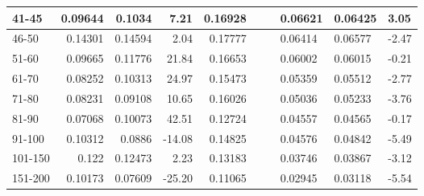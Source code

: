 \begin{table*}[]
\begin{tabular}{|l|r|r|r||r|r|r||l|l|l|}
        41-45     & 0.09644                                 & 0.1034                        & 7.21                             & 0.16928                    &                          &                            & 0.06621 & 0.06425 & 3.05  \\ \hline
        46-50     & 0.14301                                 & 0.14594                       & 2.04                             & 0.17777                    &                          &                            & 0.06414 & 0.06577 & -2.47 \\ \hline
        51-60     & 0.09665                                 & 0.11776                       & 21.84                            & 0.16653                    &                          &                            & 0.06002 & 0.06015 & -0.21 \\ \hline
        61-70     & 0.08252                                 & 0.10313                       & 24.97                            & 0.15473                    &                          &                            & 0.05359 & 0.05512 & -2.77 \\ \hline
        71-80     & 0.08231                                 & 0.09108                       & 10.65                            & 0.16026                    &                          &                            & 0.05036 & 0.05233 & -3.76 \\ \hline
        81-90     & 0.07068                                 & 0.10073                       & 42.51                            & 0.12724                    &                          &                            & 0.04557 & 0.04565 & -0.17 \\ \hline
        91-100    & 0.10312                                 & 0.0886                        & -14.08                           & 0.14825                    &                          &                            & 0.04576 & 0.04842 & -5.49 \\ \hline
        101-150   & 0.122                                   & 0.12473                       & 2.23                             & 0.13183                    &                          &                            & 0.03746 & 0.03867 & -3.12 \\ \hline
        151-200   & 0.10173                                 & 0.07609                       & -25.20                           & 0.11065                    &                          &                            & 0.02945 & 0.03118 & -5.54 \\ \hline

\end{tabular}
\end{table*}
